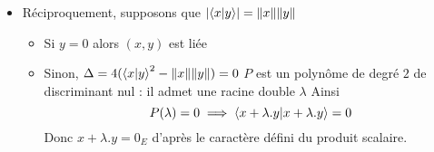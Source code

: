 \documentclass{article}
\renewenvironment{question_kholle}[2][ ]
{
	\subsection{\texorpdfstring{#2}{}}
	\notblank{#1}
	{
		\noindent #1
		\bigbreak
	}
	{}
	\begin{proof}
}
{
	\end{proof}
}
\begin{document}
\begin{question_kholle}
\begin{enumerate}
\begin{itemize}[label=$\star$]
            \item Réciproquement, supposons que $\lvert  \braket{ x | y } \rvert = \| x\| \| y\|$
                  \begin{itemize}
                    \item Si $y = 0$ alors $(x, y)$ est liée
                    \item Sinon, $\Delta = 4(\braket{ x | y }^{2} - \|x\|\|y\|) = 0$
                          $P$ est un polynôme de degré $2$ de discriminant nul : il admet une racine double $\lambda$
                          Ainsi
                          $$
                            P(\lambda) = 0 \implies \braket{ x+\lambda.y | x+\lambda.y } = 0
                          $$
                          Donc $x+\lambda .y = 0_{E}$ d'après le caractère défini du produit scalaire.
                  \end{itemize}
          \end{itemize}
  \end{enumerate}
\end{question_kholle}
\end{document}
